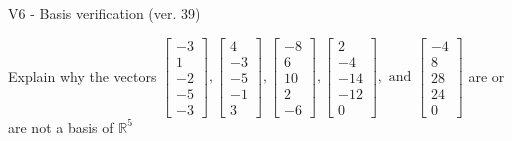 \begin{exercise}
  \begin{exerciseTitle}V6 - Basis verification (ver. 39)\end{exerciseTitle}
  \begin{exerciseStatement}
    Explain why the vectors \(\left[\begin{array}{r}
-3 \\
1 \\
-2 \\
-5 \\
-3
\end{array}\right] , \left[\begin{array}{r}
4 \\
-3 \\
-5 \\
-1 \\
3
\end{array}\right] , \left[\begin{array}{r}
-8 \\
6 \\
10 \\
2 \\
-6
\end{array}\right] , \left[\begin{array}{r}
2 \\
-4 \\
-14 \\
-12 \\
0
\end{array}\right] , \text{ and } \left[\begin{array}{r}
-4 \\
8 \\
28 \\
24 \\
0
\end{array}\right]\) are or are not a basis of \(\mathbb{R}^5\)	



\end{exerciseStatement}
\end{exercise}
